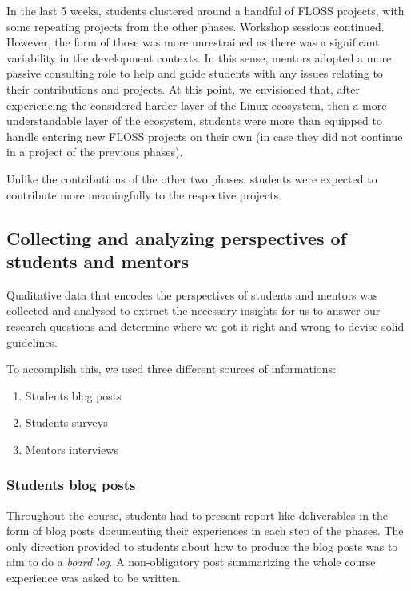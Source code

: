 In the last 5 weeks, students clustered around a handful of FLOSS projects, with
some repeating projects from the other phases. Workshop sessions continued.
However, the form of those was more unrestrained as there was a significant
variability in the development contexts. In this sense, mentors adopted a more
passive consulting role to help and guide students with any issues relating to
their contributions and projects. At this point, we envisioned that, after
experiencing the considered harder layer of the Linux ecosystem, then a more
understandable layer of the ecosystem, students were more than equipped to
handle entering new FLOSS projects on their own (in case they did not continue
in a project of the previous phases).

Unlike the contributions of the other two phases, students were expected to
contribute more meaningfully to the respective projects.

\subsection{Collecting and analyzing perspectives of students and mentors}

Qualitative data that encodes the perspectives of students and mentors was
collected and analysed to extract the necessary insights for us to answer our
research questions and determine where we got it right and wrong to devise solid
guidelines.

To accomplish this, we used three different sources of informations:

\begin{enumerate}
    \item Students blog posts
    \item Students surveys
    \item Mentors interviews
\end{enumerate}

\subsubsection{Students blog posts}

Throughout the course, students had to present report-like deliverables in the
form of blog posts documenting their experiences in each step of the phases. The
only direction provided to students about how to produce the blog posts was to
aim to do a \textit{board log}. A non-obligatory post summarizing the whole
course experience was asked to be written.

